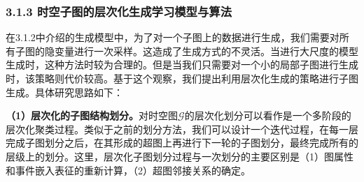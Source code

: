 \documentclass[12pt,UTF8,AutoFakeBold=2,a4paper]{ctexart} %
\begin{document}


\subsubsection{3.1.3 时空子图的层次化生成学习模型与算法}
在3.1.2中介绍的生成模型中，为了对一个子图上的数据进行生成，我们需要对所有子图的隐变量进行一次采样。这造成了生成方式的不灵活。当进行大尺度的模型生成时，这种方法时较为合理的。但是当我们只需要对一个小的局部子图进行生成时，该策略则代价较高。基于这个观察，我们提出利用层次化生成的策略进行子图生成。具体研究思路如下：

\textbf{（1）层次化的子图结构划分。}对时空图$\mathcal{G}$的层次化划分可以看作是一个多阶段的层次化聚类过程。类似于之前的划分方法，我们可以设计一个迭代过程，在每一层完成子图划分之后，在其形成的超图上再进行下一轮的子图划分，最终完成所有的层级上的划分。这里，层次化子图划分过程与一次划分的主要区别是（1）图属性和事件嵌入表征的重新计算，（2）超图邻接关系的确定。
\end{document}
